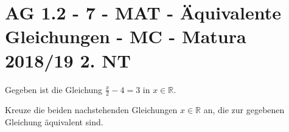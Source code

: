 \section{AG 1.2 - 7 - MAT - Äquivalente Gleichungen - MC - Matura 2018/19 2. NT}

\begin{beispiel}[AG 1.2]{1}
Gegeben ist die Gleichung $\frac{x}{2}-4=3$ in $x\in\mathbb{R}$.

Kreuze die beiden nachstehenden Gleichungen $x\in\mathbb{R}$ an, die zur gegebenen Gleichung äquivalent sind.

\end{beispiel}